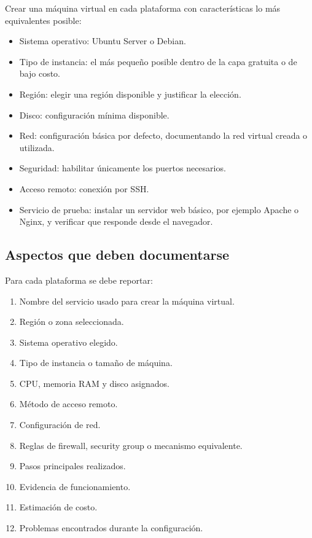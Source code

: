 \documentclass[
  coursetitle={Cómputo Nube y Tecnologías Emergentes},
  coursehours={96},
  coursedate={Verano 2026},
  doctype={Tarea 1},
  otherlangs={english,french},
  authorname={Lázaro},
  authorsurname={Bustio-Martínez},
  authortitle={PhD},
  role={Profesor Investigador},
  email={lbustio@inaoe.mx},
  phone={5559504000},
  ext={7459},
  institution={Instituto Nacional de Astrofísica, Óptica y Electrónica (INAOE)},
  department={Maestría en Ciencias en Tecnologías de Seguridad},
  address={Luis Enrique Erro 1, Sta. Ma. Tonantzintla, San Andrés Cholula, CP 72840, Puebla, México},
  margin={0.5in}
]{../../../lbustio_lecture_notes}
\begin{document}
Crear una máquina virtual en cada plataforma con características lo más equivalentes posible:

\begin{itemize}
  \item Sistema operativo: Ubuntu Server o Debian.
  \item Tipo de instancia: el más pequeño posible dentro de la capa gratuita o de bajo costo.
  \item Región: elegir una región disponible y justificar la elección.
  \item Disco: configuración mínima disponible.
  \item Red: configuración básica por defecto, documentando la red virtual creada o utilizada.
  \item Seguridad: habilitar únicamente los puertos necesarios.
  \item Acceso remoto: conexión por SSH.
  \item Servicio de prueba: instalar un servidor web básico, por ejemplo Apache o Nginx, y verificar que responde desde el navegador.
\end{itemize}

\subsection{Aspectos que deben documentarse}
\label{sec:tarea1-aspectos}

Para cada plataforma se debe reportar:

\begin{enumerate}
  \item Nombre del servicio usado para crear la máquina virtual.
  \item Región o zona seleccionada.
  \item Sistema operativo elegido.
  \item Tipo de instancia o tamaño de máquina.
  \item CPU, memoria RAM y disco asignados.
  \item Método de acceso remoto.
  \item Configuración de red.
  \item Reglas de firewall, security group o mecanismo equivalente.
  \item Pasos principales realizados.
  \item Evidencia de funcionamiento.
  \item Estimación de costo.
  \item Problemas encontrados durante la configuración.
\end{enumerate}
\end{document}
